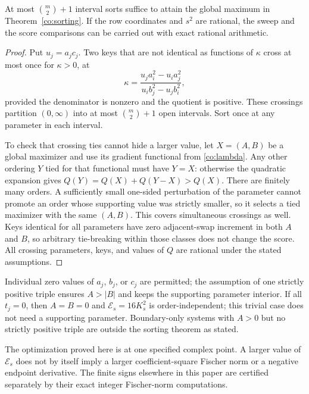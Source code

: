 \begin{corollary}\label{co:sweep}
At most \(\binom m2+1\) interval sorts suffice to attain the global
maximum in Theorem~\ref{co:sorting}. If the row coordinates and \(s^2\)
are rational, the sweep and the score comparisons can be carried out
with exact rational arithmetic.
\end{corollary}
\begin{proof}
Put \(u_j=a_jc_j\). Two keys that are not identical as functions
of \(\kappa\) cross at most once for \(\kappa>0\), at
\[
 \kappa=\frac{u_j a_i^2-u_i a_j^2}
                  {u_i b_j^2-u_j b_i^2},
\]
provided the denominator is nonzero and the quotient is positive.
These crossings partition \((0,\infty)\) into at most
\(\binom m2+1\) open intervals. Sort once at any parameter in
each interval.

To check that crossing ties cannot hide a larger value, let \(X=(A,B)\)
be a global maximizer and use its gradient functional from
\eqref{co:lambda}. Any other ordering \(Y\) tied for that functional
must have \(Y=X\): otherwise the quadratic expansion gives
\(Q(Y)=Q(X)+Q(Y-X)>Q(X)\).
There are finitely many orders. A sufficiently small one-sided
perturbation of the parameter cannot promote an order whose supporting
value was strictly smaller, so it selects a tied maximizer with the
same \((A,B)\). This covers simultaneous crossings as well.
Keys identical for all parameters have zero adjacent-swap increment
in both \(A\) and \(B\), so arbitrary tie-breaking within those
classes does not change the score. All crossing parameters, keys, and
values of \(Q\) are rational under the stated assumptions.
\end{proof}

Individual zero values of \(a_j\), \(b_j\), or \(c_j\) are permitted;
the assumption of one strictly positive triple ensures \(A>|B|\) and
keeps the supporting parameter interior. If all \(t_j=0\), then
\(A=B=0\) and \(\mathcal E_s=16K_s^2\) is order-independent; this
trivial case does not need a supporting parameter. Boundary-only
systems with \(A>0\) but no strictly positive triple are outside the
sorting theorem as stated.

The optimization proved here is at one specified complex point.
A larger value of \(\mathcal E_s\) does not by itself imply a larger
coefficient-square Fischer norm or a negative endpoint derivative.
The finite signs elsewhere in this paper are certified separately by
their exact integer Fischer-norm computations.
